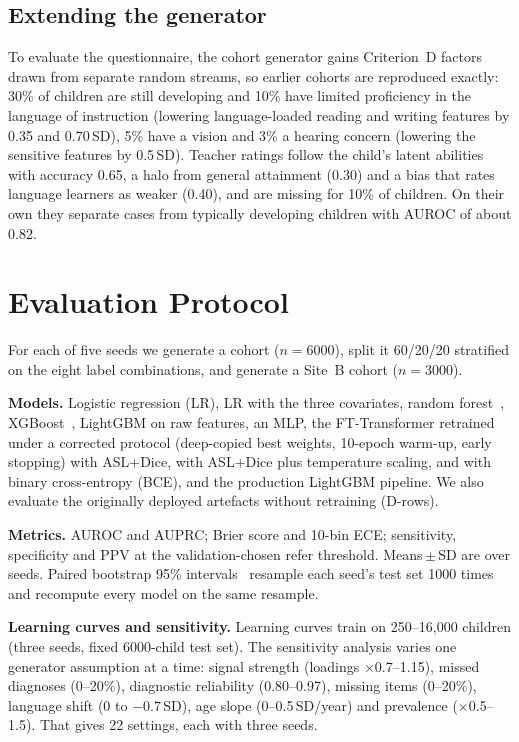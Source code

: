 \documentclass[conference]{IEEEtran}
\begin{document}
\subsection{Extending the generator}
To evaluate the questionnaire, the cohort generator gains Criterion~D factors drawn
from separate random streams, so earlier cohorts are reproduced exactly: 30\% of
children are still developing and 10\% have limited proficiency in the language of
instruction (lowering language-loaded reading and writing features by 0.35 and
0.70\,SD), 5\% have a vision and 3\% a hearing concern (lowering the sensitive
features by 0.5\,SD). Teacher ratings follow the child's latent abilities with
accuracy 0.65, a halo from general attainment (0.30) and a bias that rates language
learners as weaker (0.40), and are missing for 10\% of children. On their own they
separate cases from typically developing children with AUROC of about 0.82.

\section{Evaluation Protocol}\label{sec:protocol}
For each of five seeds we generate a cohort ($n{=}6000$), split it 60/20/20 stratified
on the eight label combinations, and generate a Site~B cohort ($n{=}3000$).

\textbf{Models.} Logistic regression (LR), LR with the three covariates, random
forest~\cite{breiman2001}, XGBoost~\cite{chen2016}, LightGBM on raw features, an MLP,
the FT-Transformer retrained under a corrected protocol (deep-copied best weights,
10-epoch warm-up, early stopping) with ASL+Dice, with ASL+Dice plus temperature
scaling, and with binary cross-entropy (BCE), and the production LightGBM pipeline. We
also evaluate the originally deployed artefacts without retraining (D-rows).

\textbf{Metrics.} AUROC and AUPRC; Brier score and 10-bin ECE; sensitivity,
specificity and PPV at the validation-chosen refer threshold. Means\,$\pm$\,SD are
over seeds. Paired bootstrap 95\% intervals~\cite{efron1993} resample each seed's
test set 1000 times and recompute every model on the same resample.

\textbf{Learning curves and sensitivity.} Learning curves train on 250--16{,}000
children (three seeds, fixed 6000-child test set). The sensitivity analysis varies one
generator assumption at a time: signal strength (loadings $\times$0.7--1.15), missed
diagnoses (0--20\%), diagnostic reliability (0.80--0.97), missing items (0--20\%),
language shift (0 to $-0.7$\,SD), age slope (0--0.5\,SD/year) and prevalence
($\times$0.5--1.5). That gives 22 settings, each with three seeds.
\end{document}
